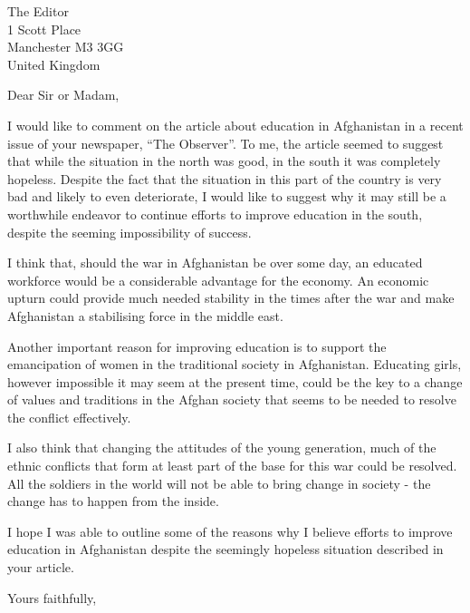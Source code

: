 \documentclass{letter}
\begin{document}
\onehalfspacing
{}\selectfont

\begin{letter}{The Editor \\
1 Scott Place \\
Manchester M3 3GG \\
United Kingdom}

\opening{Dear Sir or Madam,}

I would like to comment on the article about education in Afghanistan in a recent issue of your newspaper, ``The Observer''. To me, the article seemed to suggest that while the situation in the north was good, in the south it was completely hopeless. Despite the fact that the situation in this part of the country is very bad and likely to even deteriorate, I would like to suggest why it may still be a worthwhile endeavor to continue efforts to improve education in the south, despite the seeming impossibility of success.

I think that, should the war in Afghanistan be over some day, an educated workforce would be a considerable advantage for the economy. An economic upturn could provide much needed stability in the times after the war and make Afghanistan a stabilising force in the middle east.

Another important reason for improving education is to support the emancipation of women in the traditional society in Afghanistan. Educating girls, however impossible it may seem at the present time, could be the key to a change of values and traditions in the Afghan society that seems to be needed to resolve the conflict effectively.

I also think that changing the attitudes of the young generation, much of the ethnic conflicts that form at least part of the base for this war could be resolved. All the soldiers in the world will not be able to bring change in society - the change has to happen from the inside.

I hope I was able to outline some of the reasons why I believe efforts to improve education in Afghanistan despite the seemingly hopeless situation described in your article.

\closing{Yours faithfully,}
\end{letter}
\end{document}
